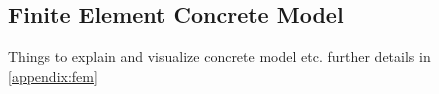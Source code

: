 \subsection{Finite Element Concrete Model}
Things to explain and visualize concrete model etc.
further details in \ref{appendix:fem}